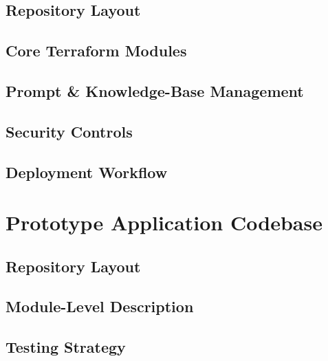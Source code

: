\subsection{Repository Layout}

\subsection{Core Terraform Modules}

\subsection{Prompt & Knowledge-Base Management}

\subsection{Security Controls}

\subsection{Deployment Workflow}

\section{Prototype Application Codebase}

\subsection{Repository Layout}

\subsection{Module-Level Description}

\subsection{Testing Strategy}

